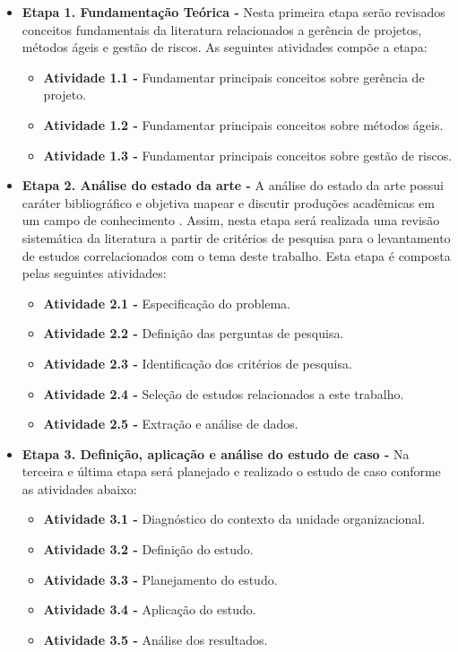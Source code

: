 \documentclass[
    12pt,       %
    openright,      %
    twoside,      %
    a4paper,      %
    english,      %
    french,       %
    spanish,      %
    brazil,       %
    ]{abntex2}
\begin{document}
\begin{itemize}[label={}]
  \item \textbf{Etapa 1. Fundamentação Teórica - } Nesta primeira etapa serão revisados conceitos fundamentais da literatura relacionados a gerência de projetos, métodos ágeis e gestão de riscos. As seguintes atividades compõe a etapa:
    \begin{itemize}[label={}]
        \item \textbf{Atividade 1.1 - } Fundamentar principais conceitos sobre gerência de projeto.
        \item \textbf{Atividade 1.2 - } Fundamentar principais conceitos sobre métodos ágeis.
        \item \textbf{Atividade 1.3 - } Fundamentar principais conceitos sobre gestão de riscos. 
    \end{itemize}
  
  
  \item \textbf{Etapa 2. Análise do estado da arte - } A análise do estado da arte possui caráter bibliográfico e objetiva mapear e discutir produções acadêmicas em um campo de conhecimento \cite{Ferreira:2002}. Assim, nesta etapa será realizada uma revisão sistemática da literatura a partir de critérios de pesquisa para o levantamento de estudos correlacionados com o tema deste trabalho. Esta etapa é composta pelas seguintes atividades:
    \begin{itemize}[label={}]
        \item \textbf{Atividade 2.1 - } Especificação do problema.
        \item \textbf{Atividade 2.2 - } Definição das perguntas de pesquisa.
        \item \textbf{Atividade 2.3 - } Identificação dos critérios de pesquisa. 
        \item \textbf{Atividade 2.4 - } Seleção de estudos relacionados a este trabalho. 
        \item \textbf{Atividade 2.5 - } Extração e análise de dados.
    \end{itemize}
  

  \item \textbf{Etapa 3. Definição, aplicação e análise do estudo de caso - } Na terceira e última etapa será planejado e realizado o estudo de caso conforme as atividades abaixo:
      \begin{itemize}[label={}]
        \item \textbf{Atividade 3.1 - } Diagnóstico do contexto da unidade organizacional.
        \item \textbf{Atividade 3.2 - } Definição do estudo.
        \item \textbf{Atividade 3.3 - } Planejamento do estudo. 
        \item \textbf{Atividade 3.4 - } Aplicação do estudo. 
        \item \textbf{Atividade 3.5 - } Análise dos resultados. 
    \end{itemize}

\end{itemize}
\end{document}
